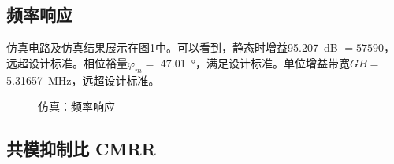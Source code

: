 \documentclass[UTF8]{ctexart}
\numberwithin{figure}{subsection}
\numberwithin{table}{subsection}
\numberwithin{equation}{subsection}
\begin{document}
\subsection{频率响应}
仿真电路及仿真结果展示在图\ref{AC simulation}中。可以看到，静态时增益\SI[]{95.207}{\dB} \( = 57590\)，远超设计标准。相位裕量\(\varphi_m = \) \SI[]{47.01}{\degree}，满足设计标准。单位增益带宽\(GB = \) \SI[]{5.31657}{\MHz}，远超设计标准。

\begin{figure}[H]
    \centering
    \caption{仿真：频率响应}
    \label{AC simulation}
\end{figure}

\subsection{共模抑制比 CMRR}
\end{document}
